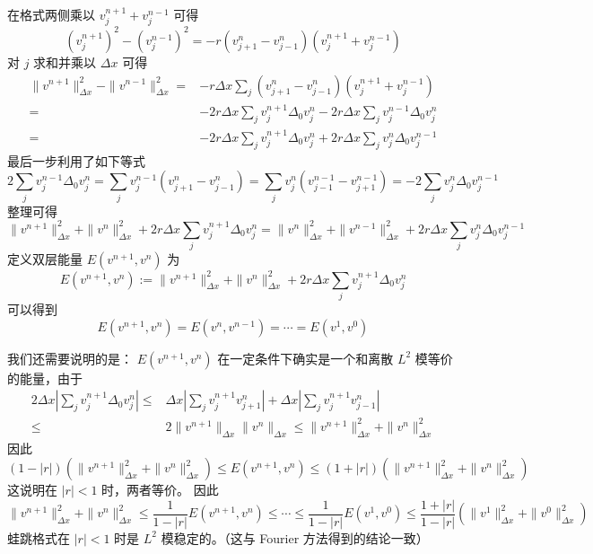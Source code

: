 \begin{solution*}
    在格式两侧乘以 $v_j^{n+1} + v_j^{n-1}$ 可得
    \[
        (v_j^{n+1})^2 - (v_j^{n-1})^2 = - r
        (v_{j+1}^n - v_{j-1}^{n})(v_j^{n+1} + v_j^{n-1})
    \]
    对 $j$ 求和并乘以 $\Delta x$ 可得
    \begin{align*}
        \|v^{n+1}\|_{\Delta x}^2 - \|v^{n-1}\|_{\Delta x}^2
        ={} & -r \Delta x \sum_j
        (v_{j+1}^n - v_{j-1}^{n})(v_j^{n+1} + v_j^{n-1})     \\
        ={} & - 2 r \Delta x \sum_j v_j^{n+1} \Delta_0 v_j^n
        - 2 r \Delta x \sum_j v_j^{n-1} \Delta_0 v_j^n       \\
        ={} &
        - 2 r \Delta x \sum_j v_j^{n+1} \Delta_0 v_j^n
        + 2 r \Delta x \sum_j v_j^n \Delta_0 v_j^{n-1}
    \end{align*}
    最后一步利用了如下等式
    \[
        2 \sum_j v_j^{n-1} \Delta_0 v_j^n
        = \sum_j v_j^{n-1} (v_{j+1}^n - v_{j-1}^n)
        = \sum_j v_j^n(v_{j-1}^{n-1}-v_{j+1}^{n-1})
        = -2 \sum_j v_j^n \Delta_0 v_j^{n-1}
    \]
    整理可得
    \[
        \|v^{n+1}\|_{\Delta x}^2 +\|v^{n}\|_{\Delta x}^2 + 2 r \Delta x \sum_j v_j^{n+1} \Delta_0 v_j^n
        =
        \|v^{n}\|_{\Delta x}^2 +\|v^{n-1}\|_{\Delta x}^2 + 2 r \Delta x \sum_j v_j^{n} \Delta_0 v_j^{n-1}
    \]
    定义双层能量 $E(v^{n+1},v^{n})$ 为
    \[
        E(v^{n+1},v^{n}) := \|v^{n+1}\|_{\Delta x}^2 +\|v^{n}\|_{\Delta x}^2 + 2 r \Delta x \sum_j v_j^{n+1} \Delta_0 v_j^n
    \]
    可以得到
    \[
        E(v^{n+1},v^{n}) = E(v^{n},v^{n-1}) = \cdots = E(v^1,v^0)
    \]

    我们还需要说明的是： $E(v^{n+1},v^{n})$ 在一定条件下确实是一个和离散 $L^2$ 模等价的能量，由于
    \begin{align*}
        2 \Delta x \left|\sum_j v_j^{n+1} \Delta_0 v_j^n\right|
        \le{} &
        \Delta x\left|\sum_j v_j^{n+1} v_{j+1}^n \right|
        + \Delta x\left|\sum_j v_j^{n+1} v_{j-1}^n \right|
        \\
        \le{} & 2 \|v^{n+1}\|_{\Delta x} \|v^{n}\|_{\Delta x}
        \le \|v^{n+1}\|_{\Delta x}^2 +\|v^{n}\|_{\Delta x}^2
    \end{align*}
    因此
    \[
        (1-|r|)\left(\|v^{n+1}\|_{\Delta x}^2 +\|v^{n}\|_{\Delta x}^2\right) \le
        E(v^{n+1},v^{n}) \le (1+|r|)\left(\|v^{n+1}\|_{\Delta x}^2 +\|v^{n}\|_{\Delta x}^2\right)
    \]
    这说明在 $|r| < 1$ 时，两者等价。
    因此
    \[
        \|v^{n+1}\|_{\Delta x}^2 +\|v^{n}\|_{\Delta x}^2
        \le \frac{1}{1-|r|} E(v^{n+1},v^n) \le \cdots \le \frac{1}{1-|r|} E(v^{1},v^0)
        \le \frac{1+|r|}{1-|r|}\left(\|v^{1}\|_{\Delta x}^2 +\|v^{0}\|_{\Delta x}^2\right)
    \]
    蛙跳格式在 $|r| < 1$ 时是 $L^2$ 模稳定的。（这与 Fourier 方法得到的结论一致）
\end{solution*}

